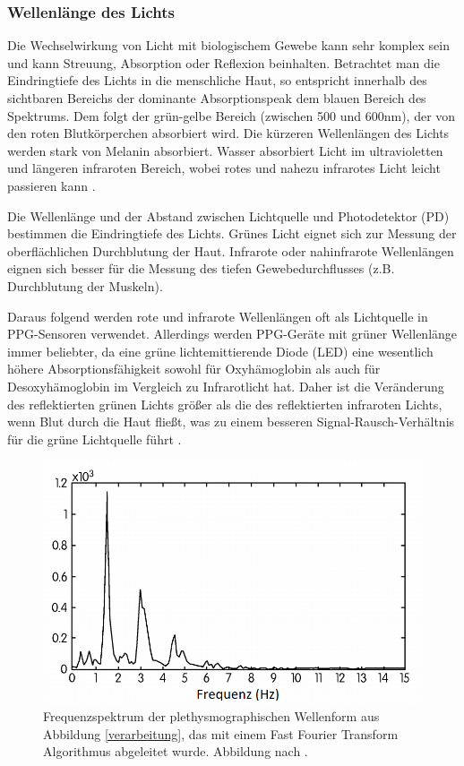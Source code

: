 \documentclass[10pt,a4paper,headinclude,twoside, plainheadsepline, open=right, numbers=noenddot, twocolumn]{article}
\begin{document}
\subsubsection{Wellenlänge des Lichts}
\label{wellenlaenge des lichts}

Die Wechselwirkung von Licht mit biologischem Gewebe kann sehr komplex sein und kann Streuung, Absorption oder Reflexion beinhalten.
Betrachtet man die Eindringtiefe des Lichts in die menschliche Haut, so entspricht innerhalb des sichtbaren Bereichs der dominante Absorptionspeak dem blauen Bereich des Spektrums.
Dem folgt der grün-gelbe Bereich (zwischen 500 und 600nm), der von den roten Blutkörperchen absorbiert wird.
Die kürzeren Wellenlängen des Lichts werden stark von Melanin absorbiert.
Wasser absorbiert Licht im ultravioletten und längeren infraroten Bereich, wobei rotes und nahezu infrarotes Licht leicht passieren kann \cite{anderson1981optics}.

Die Wellenlänge und der Abstand zwischen Lichtquelle und Photodetektor (PD) bestimmen die Eindringtiefe des Lichts. 
Grünes Licht eignet sich zur Messung der oberflächlichen Durchblutung der Haut.
Infrarote oder nahinfrarote Wellenlängen eignen sich besser für die Messung des tiefen Gewebedurchflusses (z.B. Durchblutung der Muskeln). 

Daraus folgend werden rote und infrarote Wellenlängen oft als Lichtquelle in PPG-Sensoren verwendet.
Allerdings werden PPG-Geräte mit grüner Wellenlänge  immer beliebter, da eine grüne lichtemittierende Diode (LED) eine wesentlich höhere Absorptionsfähigkeit sowohl für Oxyhämoglobin als auch für Desoxyhämoglobin im Vergleich zu Infrarotlicht hat.
Daher ist die Veränderung des reflektierten grünen Lichts größer als die des reflektierten infraroten Lichts, wenn Blut durch die Haut fließt, was zu einem besseren Signal-Rausch-Verhältnis für die grüne Lichtquelle führt \cite{john2007photopletysmography}.


\begin{figure}[ht]
	\centering
	\includegraphics[width=0.6\linewidth]{images/welle_fft.png}
	\caption{Frequenzspektrum der plethysmographischen Wellenform aus Abbildung \ref{verarbeitung}, das mit einem Fast Fourier Transform Algorithmus abgeleitet wurde. Abbildung nach \cite{mcpherson2015systems}.}
	\label{fft}
\end{figure}
\end{document}
